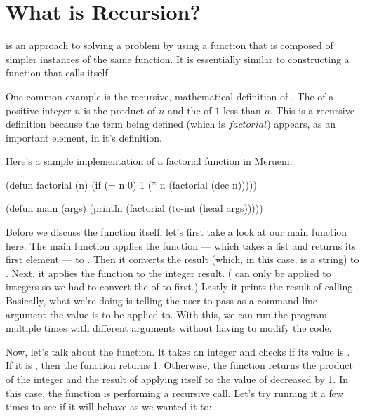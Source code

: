 \section{What is Recursion?}
 is an approach to solving a problem by using a function that is composed of simpler instances of the same function. It is essentially similar to constructing a function that calls itself. 

One common example is the recursive, mathematical definition of . The  of a positive integer $n$ is the product of $n$ and the  of $1$ less than $n$. This is a recursive definition because the term being defined (which is $factorial$) appears, as an important element, in it's definition.

Here's a sample implementation of a factorial function in Meruem:

\begin{Meruem}
(defun factorial (n)
  (if (= n 0)
    1
    (* n (factorial (dec n)))))

(defun main (args)
  (println (factorial 
             (to-int (head args)))))
\end{Meruem}

Before we discuss the  function itself, let's first take a look at our main function here. The main function applies the  function --- which takes a list and returns its first element --- to . Then it converts the result (which, in this case, is a string) to . Next, it applies the  function to the integer result. ( can only be applied to integers so we had to convert the  of  to  first.) Lastly it prints the result of calling . Basically, what we're doing is telling the user to pass as a command line argument the value  is to be applied to. With this, we can run the program multiple times with different arguments without having to modify the code.

Now, let's talk about the  function. It takes an integer and checks if its value is . If it is , then the function returns 1. Otherwise, the function returns the product of the integer  and the result of applying itself to the value of  decreased by 1. In this case, the  function is performing a recursive call. Let's try running it a few times to see if it will behave as we wanted it to:

